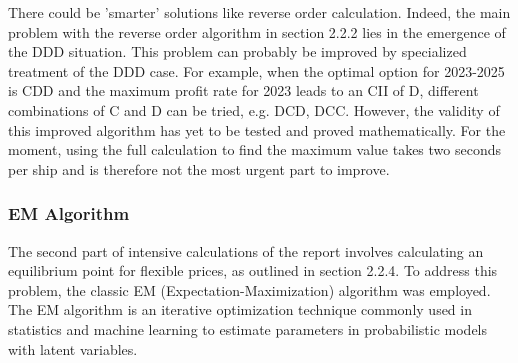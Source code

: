 \documentclass[a4paper,12pt]{article}
\begin{document}
There could be 'smarter' solutions like reverse order calculation.
Indeed, the main problem with the reverse order algorithm in section 2.2.2 lies in the emergence of the DDD situation. This problem can probably be improved by specialized treatment of the DDD case.
For example, when the optimal option for 2023-2025 is CDD and the maximum profit rate for 2023 leads to an CII of D, different combinations of C and D can be tried, e.g. DCD, DCC. However, the validity of this improved algorithm has yet to be tested and proved mathematically.
For the moment, using the full calculation to find the maximum value takes two seconds per ship and is therefore not the most urgent part to improve.\\


\subsubsection{EM Algorithm}
The second part of intensive calculations of the report involves calculating an equilibrium point for flexible prices, as outlined in section 2.2.4.
To address this problem, the classic EM (Expectation-Maximization) algorithm was employed.
The EM algorithm is an iterative optimization technique commonly used in statistics and machine learning to estimate parameters in probabilistic models with latent variables.\\


\end{document}
